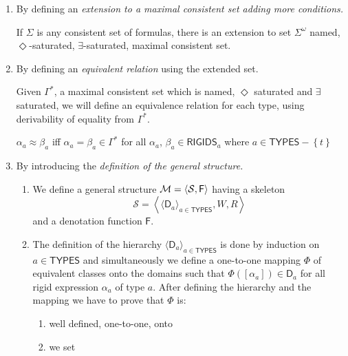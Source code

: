 \begin{enumerate}
\item By defining an \emph{extension to a maximal consistent set adding
more conditions.}

If $\Sigma$ is any consistent set of formulas, there is an extension to set 
$\Sigma ^{\omega}$ named, $\Diamond$-saturated, $\exists$-saturated,
maximal consistent set.

\item By defining an \emph{equivalent relation} using the extended set.

Given $\Gamma^{\ast}$, a maximal consistent set which is named, $\Diamond$
saturated and $\exists$ saturated, we will define an equivalence relation
for each type, using derivability of equality from $\Gamma^{\ast}$. 

$\alpha _{a}\approx \beta _{a}$ iff $\alpha _{a}=\beta _{a}\in 
\Gamma ^{\ast}$ for all $\alpha _{a}$, $\beta _{a}\in \mathsf{RIGIDS}_{a}$ where $a\in 
\mathsf{TYPES-}\left\{ t\right\} $

\item By introducing the \emph{definition of the general structure.}

\begin{enumerate}
\item We define a general structure $\mathcal{M}=\langle \mathcal{S},\mathsf{%
F}\rangle $ having a skeleton 
\begin{equation*}
\mathcal{S}=\left\langle \langle \mathsf{D}_{a}\rangle _{a\in \mathsf{TYPES}%
},W,R\right\rangle
\end{equation*}%
and a denotation function $\mathsf{F}$.

\item The definition of the hierarchy $\langle \mathsf{D}_{a}\rangle _{a\in 
\mathsf{TYPES}}$ is done by induction on $a\in \mathsf{TYPES}$ and
simultaneously we define a one-to-one mapping $\Phi $ of equivalent classes
onto the domains such that $\Phi (\left[ \alpha _{a}\right] )\in \mathsf{D}%
_{a}$ for all rigid expression $\alpha _{a}$ of type $a$. After defining the
hierarchy and the mapping we have to prove that $\Phi $ is:

\begin{enumerate}
\item well defined, one-to-one, onto

\item we set
\end{enumerate}


\end{enumerate}
\end{enumerate}
